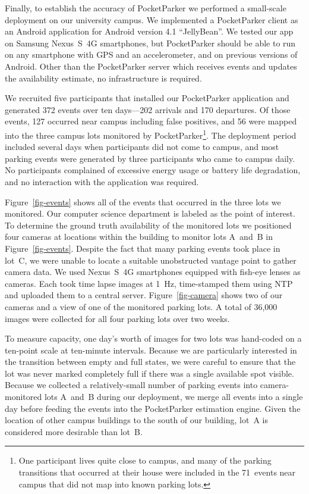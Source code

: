 Finally, to establish the accuracy of PocketParker we performed a small-scale
deployment on our university campus. We implemented a PocketParker client as
an Android application for Android version 4.1 ``JellyBean''. We tested our
app on Samsung Nexus~S~4G smartphones, but PocketParker should be able to run
on any smartphone with GPS and an accelerometer, and on previous versions of
Android. Other than the PocketParker server which receives events and updates
the availability estimate, no infrastructure is required.

We recruited five participants that installed our PocketParker application
and generated 372 events over ten days---202 arrivals and 170 departures. Of
those events, 127 occurred near campus including false positives, and 56 were
mapped into the three campus lots monitored by PocketParker\footnote{One
participant lives quite close to campus, and many of the parking transitions
that occurred at their house were included in the 71~events near campus that
did not map into known parking lots.}. The deployment period included several
days when participants did not come to campus, and most parking events were
generated by three participants who came to campus daily. No participants
complained of excessive energy usage or battery life degradation, and no
interaction with the application was required.

Figure~\ref{fig-events} shows all of the events that occurred in the three
lots we monitored. Our computer science department is labeled as the point of
interest. To determine the ground truth availability of the monitored lots we
positioned four cameras at locations within the building to monitor lots
A~and~B in Figure~\ref{fig-events}. Despite the fact that many parking events
took place in lot~C, we were unable to locate a suitable unobstructed vantage
point to gather camera data. We used Nexus~S~4G smartphones equipped with
fish-eye lenses as cameras. Each took time lapse images at 1~Hz, time-stamped
them using NTP and uploaded them to a central server. Figure~\ref{fig-camera}
shows two of our cameras and a view of one of the monitored parking lots. A
total of 36,000 images were collected for all four parking lots over two
weeks.

To measure capacity, one day's worth of images for two lots was hand-coded on
a ten-point scale at ten-minute intervals. Because we are particularly
interested in the transition between empty and full states, we were careful
to ensure that the lot was never marked completely full if there was a single
available spot visible. Because we collected a relatively-small number of
parking events into camera-monitored lots A~and~B during our deployment, we
merge all events into a single day before feeding the events into the
PocketParker estimation engine. Given the location of other campus buildings
to the south of our building, lot~A is considered more desirable than lot~B.

